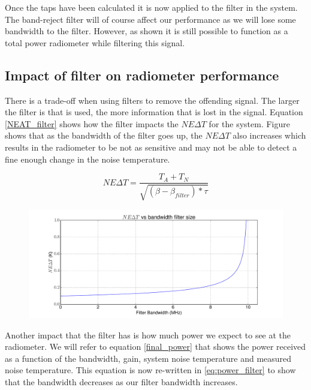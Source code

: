 Once the taps have been calculated it is now applied to the filter in the system.  The band-reject filter will of course affect our performance as we will lose some bandwidth to the filter.  However, as shown it is still possible to function as a total power radiometer while filtering this signal.  

\subsection{Impact of filter on radiometer performance}
There is a trade-off when using filters to remove the offending signal.  The larger the filter is that is used, the more information that is lost in the signal.  Equation \ref{NEAT_filter} shows how the filter impacts the $NE\Delta T$ for the system.  Figure shows that as the bandwidth of the filter goes up, the $NE\Delta T$ also increases which results in the radiometer to be not as sensitive and may not be able to detect a fine enough change in the noise temperature.

\begin{equation} \label{NEAT_filter}
NE\Delta T=\frac{T_{A}+T_{N}}{\sqrt{(\beta - \beta_{filter}) * \tau}}
\end{equation}

\begin{figure}[h!tb] \centering

\includegraphics[width=\textwidth]{Experiments/Exp5/neatvsbw_plot.pdf}

\label{neatvsbw}
\end{figure}

Another impact that the filter has is how much power we expect to see at the radiometer.  We will refer to equation \ref{final_power} that shows the power received as a function of the bandwidth, gain, system noise temperature and measured noise temperature.  This equation is now re-written in \ref{eq:power_filter} to show that the bandwidth decreases as our filter bandwidth increases.

